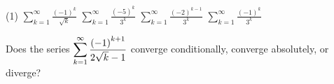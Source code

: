 \documentclass[../mathNotesPreamble]{subfiles}
\begin{document}
  \begin{tasks}[after-item-skip=\stretch{1}, label=,item-indent=0pt](1)
    \task $\displaystyle\sum_{k=1}^\infty \frac{(-1)^k}{\sqrt{k}}$
    \task $\displaystyle\sum_{k=1}^\infty \frac{(-5)^k}{3^k}$
    \task $\displaystyle\sum_{k=1}^\infty \frac{(-2)^{k-1}}{3^k}$
    \task $\displaystyle\sum_{k=1}^\infty \frac{(-1)^k}{3^k}$
  \end{tasks}
  \pagebreak

  \begin{ex*}
    Does the series $\displaystyle\sum_{k=1}^\infty \frac{{\left(-1\right)}^{k+1}}{2\sqrt{k}-1}$ converge conditionally, converge absolutely, or diverge?
  \end{ex*}
  \pagebreak
\end{document}
